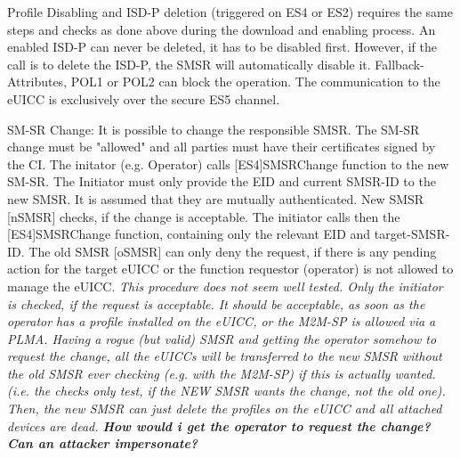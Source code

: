Profile Disabling and ISD-P deletion (triggered on ES4 or ES2) requires the same steps and checks as done above during the download and enabling process. An enabled ISD-P can never be deleted, it has to be disabled first. However, if the call is to delete the ISD-P, the SMSR will automatically disable it. Fallback-Attributes, POL1 or POL2 can block the operation. The communication to the eUICC is exclusively over the secure ES5 channel.

SM-SR Change: It is possible to change the responsible SMSR. The SM-SR change must be "allowed" and all parties must have their certificates signed by the CI. The initator (e.g. Operator) calls [ES4]SMSRChange function to the new SM-SR. The Initiator must only provide the EID and current SMSR-ID to the new SMSR. It is assumed that they are mutually authenticated. New SMSR [nSMSR] checks, if the change is acceptable. The initiator calls then the [ES4]SMSRChange function, containing only the relevant EID and target-SMSR-ID. The old SMSR [oSMSR] can only deny the request, if there is any pending action for the target eUICC or the function requestor (operator) is not allowed to manage the eUICC. \textit{This procedure does not seem well tested. Only the initiator is checked, if the request is acceptable. It should be acceptable, as soon as the operator has a profile installed on the eUICC, or the M2M-SP is allowed via a PLMA. Having a rogue (but valid) SMSR and getting the operator somehow to request the change, all the eUICCs will be transferred to the new SMSR without the old SMSR ever checking (e.g. with the M2M-SP) if this is actually wanted. (i.e. the checks only test, if the NEW SMSR wants the change, not the old one). Then, the new SMSR can just delete the profiles on the eUICC and all attached devices are dead. \textbf{How would i get the operator to request the change? Can an attacker impersonate?}} 
